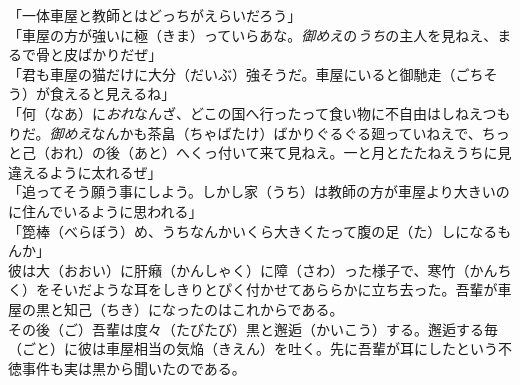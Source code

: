 \documentclass{book}
\begin{document}
「一体車屋と教師とはどっちがえらいだろう」\\
「車屋の方が強いに極（きま）っていらあな。\emph{御めえ}の\emph{うち}の主人を見ねえ、まるで骨と皮ばかりだぜ」\\
「君も車屋の猫だけに大分（だいぶ）強そうだ。車屋にいると御馳走（ごちそう）が食えると見えるね」\\
「何（なあ）に\emph{おれ}なんざ、どこの国へ行ったって食い物に不自由はしねえつもりだ。\emph{御めえ}なんかも茶畠（ちゃばたけ）ばかりぐるぐる廻っていねえで、ちっと己（おれ）の後（あと）へくっ付いて来て見ねえ。一と月とたたねえうちに見違えるように太れるぜ」\\
「追ってそう願う事にしよう。しかし家（うち）は教師の方が車屋より大きいのに住んでいるように思われる」\\
「箆棒（べらぼう）め、うちなんかいくら大きくたって腹の足（た）しになるもんか」\\
彼は大（おおい）に肝癪（かんしゃく）に障（さわ）った様子で、寒竹（かんちく）をそいだような耳をしきりとぴく付かせてあららかに立ち去った。吾輩が車屋の黒と知己（ちき）になったのはこれからである。\\
その後（ご）吾輩は度々（たびたび）黒と邂逅（かいこう）する。邂逅する毎（ごと）に彼は車屋相当の気焔（きえん）を吐く。先に吾輩が耳にしたという不徳事件も実は黒から聞いたのである。\\
\end{document}
